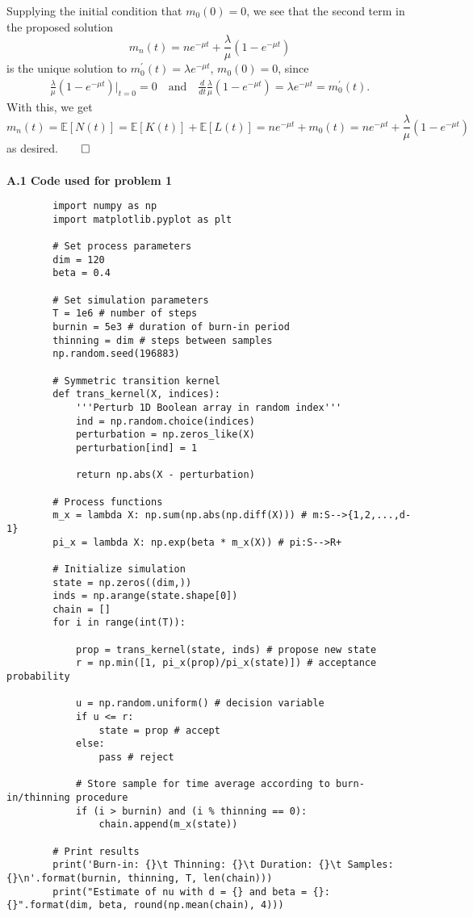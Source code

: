 \documentclass[11pt, letterpaper]{article}
\newcommand{\mbb}[1]{\mathbb{#1}}
\begin{document}
    Supplying the initial condition that $m_0(0)=0$, we see that the second term in the proposed solution
    \[m_n(t)=ne^{-\mu t}+\frac{\lambda}{\mu}(1-e^{-\mu t})\]
    is the unique solution to $m_0^\prime(t)=\lambda e^{-\mu t}$, $m_0(0)=0$, since
    \begin{align*}
        \frac{\lambda}{\mu}(1-e^{-\mu t})\bigg|_{t=0}=0\quad\text{and}\quad\frac{d}{dt}\frac{\lambda}{\mu}(1-e^{-\mu t})=\lambda e^{-\mu t}=m_0^\prime(t).
    \end{align*}
    With this, we get
    \[m_n(t)=\mbb{E}[N(t)]=\mbb{E}[K(t)]+\mbb{E}[L(t)]=ne^{-\mu t}+m_0(t)=ne^{-\mu t}+\frac{\lambda}{\mu}(1-e^{-\mu t})\]
    as desired.\hfill{$\qed$}\\[10pt]
    \\[10pt]
    {\bf A.1 Code used for problem 1}
    \begin{verbatim}
        import numpy as np
        import matplotlib.pyplot as plt

        # Set process parameters
        dim = 120
        beta = 0.4

        # Set simulation parameters
        T = 1e6 # number of steps
        burnin = 5e3 # duration of burn-in period
        thinning = dim # steps between samples
        np.random.seed(196883) 

        # Symmetric transition kernel
        def trans_kernel(X, indices):
            '''Perturb 1D Boolean array in random index'''
            ind = np.random.choice(indices)
            perturbation = np.zeros_like(X)
            perturbation[ind] = 1

            return np.abs(X - perturbation)

        # Process functions
        m_x = lambda X: np.sum(np.abs(np.diff(X))) # m:S-->{1,2,...,d-1}
        pi_x = lambda X: np.exp(beta * m_x(X)) # pi:S-->R+

        # Initialize simulation
        state = np.zeros((dim,))
        inds = np.arange(state.shape[0])
        chain = []
        for i in range(int(T)):

            prop = trans_kernel(state, inds) # propose new state
            r = np.min([1, pi_x(prop)/pi_x(state)]) # acceptance probability

            u = np.random.uniform() # decision variable
            if u <= r:
                state = prop # accept
            else:
                pass # reject

            # Store sample for time average according to burn-in/thinning procedure
            if (i > burnin) and (i % thinning == 0):
                chain.append(m_x(state))

        # Print results
        print('Burn-in: {}\t Thinning: {}\t Duration: {}\t Samples: {}\n'.format(burnin, thinning, T, len(chain)))
        print("Estimate of nu with d = {} and beta = {}: {}".format(dim, beta, round(np.mean(chain), 4)))
    \end{verbatim}
\end{document}
